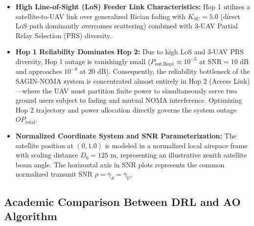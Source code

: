 \begin{itemize}
    \item \textbf{High Line-of-Sight (LoS) Feeder Link Characteristics:} Hop 1 utilizes a satellite-to-UAV link over generalized Rician fading with $K_{SU} = 5.0$ (direct LoS path dominantly overcomes scattering) combined with 3-UAV Partial Relay Selection (PRS) diversity.
    \item \textbf{Hop 1 Reliability Dominates Hop 2:} Due to high LoS and 3-UAV PRS diversity, Hop 1 outage is vanishingly small ($P_{\text{out,Hop1}} \approx 10^{-5}$ at $\text{SNR} = 10$ dB and approaches $10^{-9}$ at $20$ dB). Consequently, the reliability bottleneck of the SAGIN-NOMA system is concentrated almost entirely in Hop 2 (Access Link)---where the UAV must partition finite power to simultaneously serve two ground users subject to fading and mutual NOMA interference. Optimizing Hop 2 trajectory and power allocation directly governs the system outage $OP_{\text{total}}$.
    \item \textbf{Normalized Coordinate System and SNR Parameterization:} The satellite position at $(0, 1.0)$ is modeled in a normalized local airspace frame with scaling distance $D_0 = 125$ m, representing an illustrative zenith satellite beam angle. The horizontal axis in SNR plots represents the common normalized transmit SNR $\rho = \bar{\gamma}_S = \bar{\gamma}_U$.
\end{itemize}

\subsection*{Academic Comparison Between DRL and AO Algorithm}


